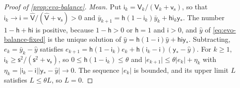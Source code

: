 \begin{proof}[Proof of \cref{prop:evo-balance}]
\emph{Mean.} Put $\mathsf i_k=\mathsf V_k/(\mathsf V_k+\mathsf v_{\mathrm s})$, so that $\mathsf i_k\to\mathsf i=\hat{\mathsf V}/(\hat{\mathsf V}+\mathsf v_{\mathrm s})>0$ and $\bar y_{k+1}=\mathsf h(1-\mathsf i_k)\bar y_k+\mathsf h\mathsf i_k\mathsf y_\ast$. The number $1-\mathsf h+\mathsf h\mathsf i$ is positive, because $1-\mathsf h>0$ or $\mathsf h=1$ and $\mathsf i>0$, and $\hat y$ of \eqref{eq:evo-balance-fixed} is the unique solution of $\hat y=\mathsf h(1-\mathsf i)\hat y+\mathsf h\mathsf i\mathsf y_\ast$. Subtracting, $e_k=\bar y_k-\hat y$ satisfies $e_{k+1}=\mathsf h(1-\mathsf i_k)e_k+\mathsf h(\mathsf i_k-\mathsf i)(\mathsf y_\ast-\hat y)$. For $k\ge1$, $\mathsf i_k\ge\mathsf s^2/(\mathsf s^2+\mathsf v_{\mathrm s})$, so $0\le\mathsf h(1-\mathsf i_k)\le\theta$ and $\lvert e_{k+1}\rvert\le\theta\lvert e_k\rvert+\eta_k$ with $\eta_k=\lvert\mathsf i_k-\mathsf i\rvert\lvert\mathsf y_\ast-\hat y\rvert\to0$. The sequence $\lvert e_k\rvert$ is bounded, and its upper limit $L$ satisfies $L\le\theta L$, so $L=0$.


\end{proof}
